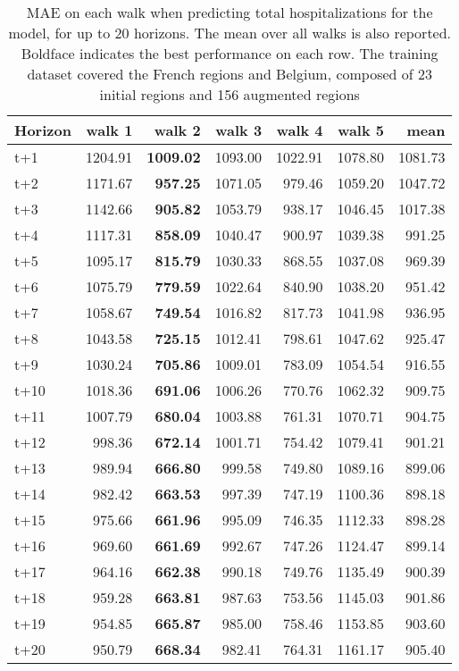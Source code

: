 \begin{table}[H]
\centering
\caption{MAE on each walk when predicting total hospitalizations for the model, for up to 20 horizons. The mean over all walks is also reported. Boldface indicates the best performance on each row. The training dataset covered the French regions and Belgium, composed of 23 initial regions and 156 augmented regions }
\label{tab:MAE_walk_encoder_decoder}
\begin{tabular}{lrrrrrr}
\toprule
Horizon &  walk 1 &  walk 2 &  walk 3 &  walk 4 &  walk 5 &    mean \\
\midrule
t+1  & 1204.91  & \textbf{1009.02}  & 1093.00  & 1022.91  & 1078.80  & 1081.73  \\
t+2  & 1171.67  & \textbf{957.25}  & 1071.05  & 979.46  & 1059.20  & 1047.72  \\
t+3  & 1142.66  & \textbf{905.82}  & 1053.79  & 938.17  & 1046.45  & 1017.38  \\
t+4  & 1117.31  & \textbf{858.09}  & 1040.47  & 900.97  & 1039.38  & 991.25  \\
t+5  & 1095.17  & \textbf{815.79}  & 1030.33  & 868.55  & 1037.08  & 969.39  \\
t+6  & 1075.79  & \textbf{779.59}  & 1022.64  & 840.90  & 1038.20  & 951.42  \\
t+7  & 1058.67  & \textbf{749.54}  & 1016.82  & 817.73  & 1041.98  & 936.95  \\
t+8  & 1043.58  & \textbf{725.15}  & 1012.41  & 798.61  & 1047.62  & 925.47  \\
t+9  & 1030.24  & \textbf{705.86}  & 1009.01  & 783.09  & 1054.54  & 916.55  \\
t+10  & 1018.36  & \textbf{691.06}  & 1006.26  & 770.76  & 1062.32  & 909.75  \\
t+11  & 1007.79  & \textbf{680.04}  & 1003.88  & 761.31  & 1070.71  & 904.75  \\
t+12  & 998.36  & \textbf{672.14}  & 1001.71  & 754.42  & 1079.41  & 901.21  \\
t+13  & 989.94  & \textbf{666.80}  & 999.58  & 749.80  & 1089.16  & 899.06  \\
t+14  & 982.42  & \textbf{663.53}  & 997.39  & 747.19  & 1100.36  & 898.18  \\
t+15  & 975.66  & \textbf{661.96}  & 995.09  & 746.35  & 1112.33  & 898.28  \\
t+16  & 969.60  & \textbf{661.69}  & 992.67  & 747.26  & 1124.47  & 899.14  \\
t+17  & 964.16  & \textbf{662.38}  & 990.18  & 749.76  & 1135.49  & 900.39  \\
t+18  & 959.28  & \textbf{663.81}  & 987.63  & 753.56  & 1145.03  & 901.86  \\
t+19  & 954.85  & \textbf{665.87}  & 985.00  & 758.46  & 1153.85  & 903.60  \\
t+20  & 950.79  & \textbf{668.34}  & 982.41  & 764.31  & 1161.17  & 905.40  \\

\bottomrule
\end{tabular}
\end{table}
